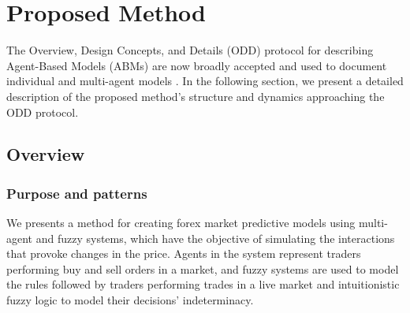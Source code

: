\documentclass{ieeeaccess}
\begin{document}

\section{Proposed Method}
\label{section:proposed-method}

The Overview, Design Concepts, and Details (ODD) protocol for describing Agent-Based Models (ABMs) are now broadly accepted and used to document individual and multi-agent models \cite{Grimm2020}. In the following section, we present a detailed description of the proposed method's structure and dynamics approaching the ODD protocol.     



\subsection{Overview}
\label{subsection:overview}

\subsubsection{Purpose and patterns}
\label{subsubsection:purpose-and-patterns}
We presents a method for creating forex market predictive models using multi-agent and fuzzy systems, which have the objective of simulating the interactions that provoke changes in the price. Agents in the system represent traders performing buy and sell orders in a market, and fuzzy systems are used to model the rules followed by traders performing trades in a live market and intuitionistic fuzzy logic to model their decisions' indeterminacy.
\end{document}
